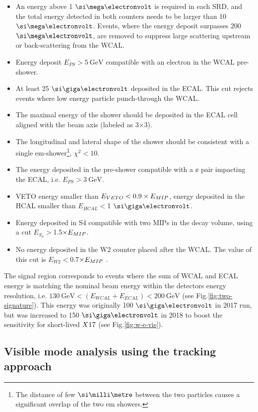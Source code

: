 \begin{itemize}
\item An energy above 1 $\mev$ is required in each SRD, and the total energy detected in both counters needs to be larger than 10 $\mev$. Events, where the energy deposit surpasses 200 $\mev$, are removed to suppress large scattering upstream or back-scattering from the WCAL.
\item Energy deposit $E_{PS} > \SI{5}{\giga\electronvolt}$ compatible with an electron in the WCAL pre-shower.
\item At least 25 $\gev$ deposited in the ECAL. This cut rejects events where low energy particle punch-through the WCAL.
\item The maximal energy of the shower should be deposited in the ECAL cell aligned with the beam axis (labeled as 3$\times$3). 
\item The longitudinal and lateral shape of the shower should be consistent with a single em-shower\footnote{The distance of few $\mmi$ between the two particles causes a significant overlap of the two em showers.}, $\chi^2 < 10$.
\item The energy deposited in the pre-shower compatible with a $\ee$ pair impacting the ECAL, i.e. $E_{PS} > \SI{3}{\giga\electronvolt}$.
\item VETO energy smaller than $E_{VETO} < 0.9\times E_{MIP}$, energy deposited in the HCAL smaller than $E_{HCAL}<$1 $\gev$.
\item Energy deposited in S4 compatible with two MIPs in the decay volume, using a cut $E_{S_4} > $1.5$\times E_{MIP}$.
\item  No energy deposited in the W2 counter placed after the WCAL. The value of this cut is $E_{W2} < $0.7$\times E_{MIP}$ \cite{Banerjee:2019hmi}.
\end{itemize}

The signal region corresponds to events where the sum of WCAL and ECAL energy is matching the nominal beam energy within the detectors energy resolution, i.e. $\SI{130}{\giga\electronvolt} < (E_{WCAL} + E_{ECAL}) < \SI{200}{\giga\electronvolt}$ (see Fig.\ref{fig:two-signature}). This energy was originally 100 $\gev$ in 2017 run, but was increased to 150 $\gev$ in 2018 to boost the sensitivity for short-lived $X17$ (see Fig.\ref{fig:w-e-vis}).

\subsection{Visible mode analysis using the tracking approach}
\label{ch3:sec:vis-mode-tracking}

